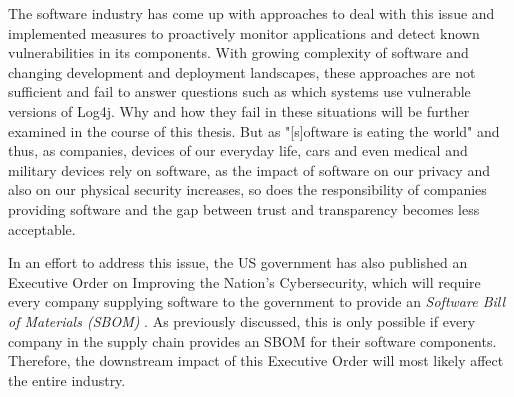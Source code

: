 The software industry has come up with approaches to deal with this issue and implemented measures to proactively monitor applications and detect known vulnerabilities in its components. With growing complexity of software and changing development and deployment landscapes, these approaches are not sufficient and fail to answer questions such as which systems use vulnerable versions of Log4j. Why and how they fail in these situations will be further examined in the course of this thesis. 
But as "[s]oftware is eating the world"\cite{MarcAndreessen} and thus, as companies, devices of our everyday life, cars and even medical and military devices rely on software, as the impact of software on our privacy and also on our physical security increases, so does the responsibility of companies providing software and the gap between trust and transparency becomes less acceptable.\par
In an effort to address this issue, the US government has also published an Executive Order on Improving the Nation's Cybersecurity, which will require every company supplying software to the government to provide an \textit{Software Bill of Materials (SBOM)} \cite{ExecutiveOrderSBOM,NTIASBOM}. As previously discussed, this is only possible if every company in the supply chain provides an SBOM for their software components. Therefore, the downstream impact of this Executive Order will most likely affect the entire industry.

